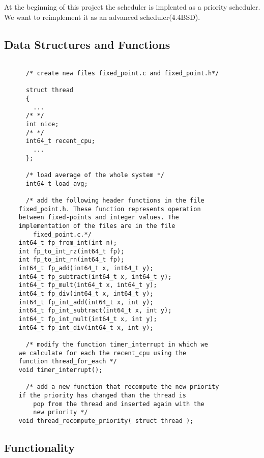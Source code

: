 	At the beginning of this project the scheduler is implented as a priority scheduler. We want to reimplement it as an advanced scheduler(4.4BSD).

    \subsection{Data Structures and Functions}

    \begin{lstlisting}

      /* create new files fixed_point.c and fixed_point.h*/

      struct thread
      {
	    ...
	  /* */
	  int nice;
	  /* */
	  int64_t recent_cpu;
	    ...
      };

      /* load average of the whole system */
      int64_t load_avg;

      /* add the following header functions in the file
	fixed_point.h. These function represents operation
	between fixed-points and integer values. The 
	implementation of the files are in the file 
        fixed_point.c.*/
	int64_t fp_from_int(int n);
	int fp_to_int_rz(int64_t fp);
	int fp_to_int_rn(int64_t fp);
	int64_t fp_add(int64_t x, int64_t y);
	int64_t fp_subtract(int64_t x, int64_t y);
	int64_t fp_mult(int64_t x, int64_t y);
	int64_t fp_div(int64_t x, int64_t y);
	int64_t fp_int_add(int64_t x, int y);
	int64_t fp_int_subtract(int64_t x, int y);
	int64_t fp_int_mult(int64_t x, int y);
	int64_t fp_int_div(int64_t x, int y);

      /* modify the function timer_interrupt in which we
	we calculate for each the recent_cpu using the 
	function thread_for_each */
	void timer_interrupt();

      /* add a new function that recompute the new priority
	if the priority has changed than the thread is 
        pop from the thread and inserted again with the
        new priority */
	void thread_recompute_priority( struct thread );

    \end{lstlisting}


    \subsection{Functionality}

